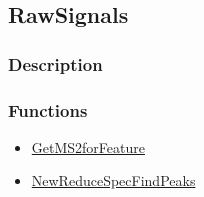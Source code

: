 \subsection{RawSignals}\label{RawSignals}
\subsubsection{Description}


\subsubsection{Functions}
\begin{itemize}
\item \hyperref[GetMS2forFeature]{GetMS2forFeature}
\item \hyperref[NewReduceSpecFindPeaks]{NewReduceSpecFindPeaks}
\end{itemize}

